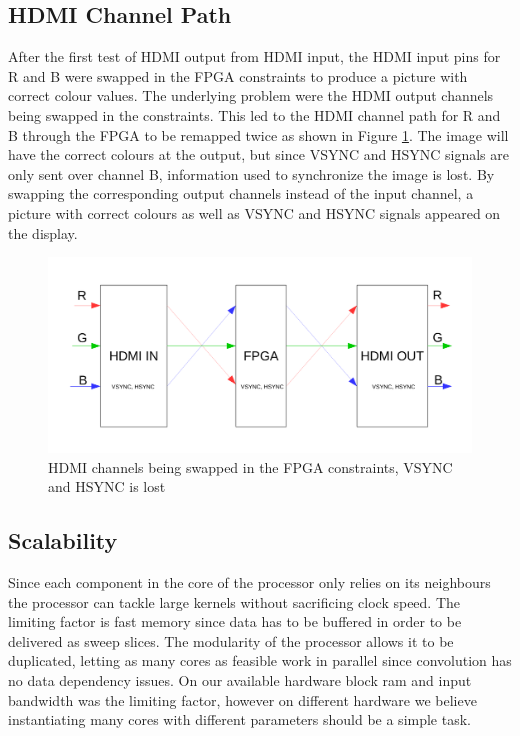 \subsection{HDMI Channel Path}
After the first test of HDMI output from HDMI input, the HDMI input pins for R and B were swapped in the FPGA constraints to produce a picture with correct colour values.
The underlying problem were the HDMI output channels being swapped in the constraints. 
This led to the HDMI channel path for R and B through the FPGA to be remapped twice as shown in Figure \ref{fig:hdmiChannelPath}.
The image will have the correct colours at the output, but since VSYNC and HSYNC signals are only sent over channel B, information used to synchronize the image is lost.
By swapping the corresponding output channels instead of the input channel, a picture with correct colours as well as VSYNC and HSYNC signals appeared on the display.

\begin{figure}[h!]
    \includegraphics[width=\linewidth]{img/hdmi_channel_path.pdf}
    \caption[HDMI channels being swapped in the FPGA constraints]{
        HDMI channels being swapped in the FPGA constraints, VSYNC and HSYNC is lost
    }
    \label{fig:hdmiChannelPath}
\end{figure}

\subsection{Scalability}
Since each component in the core of the processor only relies on its neighbours the processor can tackle large kernels without sacrificing clock speed.
The limiting factor is fast memory since data has to be buffered in order to be delivered as sweep slices.
The modularity of the processor allows it to be duplicated, letting as many cores as feasible work in parallel since convolution has no data dependency issues.
On our available hardware block ram and input bandwidth was the limiting factor, however on different hardware we believe instantiating many cores with different parameters should be a simple task.

